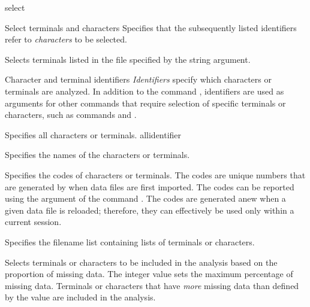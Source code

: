 \begin{command}{select}{}
\begin{arguments}
\begin{argumentgroup}{Select terminals and characters}
                {Specifies that the subsequently listed identifiers
                refer to \emph{characters} to be selected.}
                {}

                {Selects terminals listed in the file specified by the string argument.}
                {}

		\end{argumentgroup}
		
        \begin{argumentgroup}{Character and terminal identifiers}\label{identifiers}
        {\emph{Identifiers} specify which characters or terminals are analyzed.
        In addition to the command , identifiers are used as
        arguments for other commands that require selection of specific terminals or
        characters, such as commands  and
        .}

                {Specifies all characters or terminals.}
                {allidentifier}

                {Specifies the names of the characters or terminals.}
                {}

                {Specifies the codes of characters or terminals. The codes are unique
                numbers that are generated by \poy when data files are first imported.
                The codes can be reported using the argument 
                of the command . The codes are generated anew
                when a given data file is reloaded; therefore, they can effectively be used
                only within a current \poy session.}
                {}

                {Specifies the filename list containing lists of terminals or
                characters.}
                {}

                {Selects terminals or characters to be included in the analysis
                based on the proportion of missing data. The
                integer value sets the maximum percentage of missing
                data. Terminals or characters that have \emph{more} missing data
                than defined by the value are included in the analysis.}
                {}
               

\end{argumentgroup}
\end{arguments}
\end{command}
